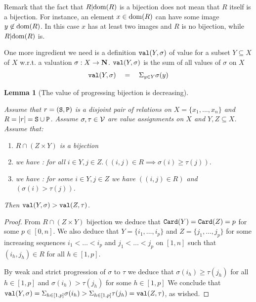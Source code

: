 \documentclass{lmcs}
\newtheorem{lemma}[theorem]{Lemma}
\begin{document}

Remark that the fact that $R{|} {\rm dom}(R)$ is a bijection 
does not mean that $R$ itself is a bijection. For instance, an element 
$x \in {\rm dom}(R)$ can have some image $y \not \in {\rm dom}(R)$. In this case $x$ 
has at least two images and $R$ is no bijection, while $R{|} {\rm dom}(R)$ is.

One more ingredient we need is a definition ${\tt val}(Y,\sigma)$ of value for 
a subset $Y \subseteq X$ of $X$ w.r.t. a valuation 
$\sigma:X \rightarrow {\bf N}$. 
${\tt val}(Y,\sigma)$ is the sum of all values of $\sigma$ on $X$ 
$$
	{\tt val}(Y,\sigma)  \ \ \ = \ \ \  \Sigma_{y \in Y} \sigma(y)
$$


\begin{lemma}[The value of progressing bijection is decreasing]
\label{lemma-decreasing-progressing-bijection}

Assume that $r = ({\tt S},{\tt P})$ is a disjoint pair of 
relations on $X = \{x_1, \ldots, x_n\}$
and $R= {| r |} = {\tt S} \cup {\tt P}$.
Assume $\sigma, \tau \in {{\mathcal V}}$ are value assignments on $X$
and $Y, Z \subseteq X$. Assume that:

\begin{enumerate}
\item
$R \cap (Z \times Y)$ is a bijection 
\item
we have
:
for all $i \in Y, j \in Z. ((i,j) \in R \implies \sigma(i) \ge \tau(j))$.
\item
we have :
for some $i \in Y, j \in Z$ we have
$((i,j) \in R)$ and $(\sigma(i) > \tau(j))$.
\end{enumerate}

Then ${\tt val}(Y,\sigma) > {\tt val}(Z,\tau)$.

\end{lemma}


\begin{proof}
From $R \cap (Z \times Y)$ bijection we deduce that
 ${\tt Card}(Y) = {\tt Card}(Z) = p$ for some $p \in [0,n]$. 
We also deduce that $Y = \{i_1, \ldots, i_p\}$ and $Z = \{j_1, \ldots, j_p\}$
for some increasing sequences $i_1 < \ldots < i_p$
and $j_1 < \ldots < j_p$ on $[1,n]$ such that $(i_h, j_h) \in R$ for all
$h \in [1,p]$.

By weak and strict progression of $\sigma$ to $\tau$ we deduce that 
$\sigma(i_h) \ge \tau(j_h)$ for all $h \in [1,p]$
and $\sigma(i_h) > \tau(j_h)$ for some $h \in [1,p]$
We conclude that 
$
{\tt val}(Y,\sigma)                               = 
\Sigma_{h \in [1,p]} \sigma(i_h) >  
\Sigma_{h \in [1,p]} \tau(j_h)      =
{\tt val}(Z,\tau)
$,
as wished. 
\end{proof}
\end{document}
